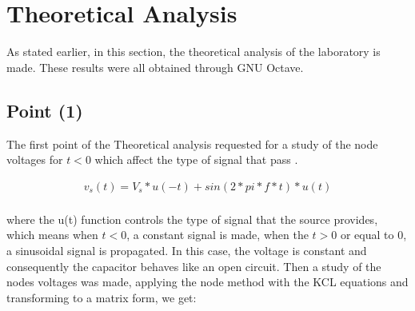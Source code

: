 \section{Theoretical Analysis}
\label{sec:analysis}

\par As stated earlier, in this section, the theoretical analysis of the laboratory is made. These results were all obtained through GNU Octave.



\subsection{Point (1)} 

\par The first point of the Theoretical analysis requested for a study of the node voltages for $t<0$ which affect the type of signal that pass . 

\begin{align*}  
v_s(t)=V_s*u(-t)+sin(2*pi*f*t)*u(t)\\   
\end{align*} 

where the u(t) function controls the type of signal that the source provides, which means when $t<0$, a constant signal is made, when the $t>0$ or equal to 0, a sinusoidal signal is propagated.  
In this case, the voltage is constant and consequently the capacitor behaves like an open circuit. Then a study of the nodes voltages was made, applying the node method with the KCL equations and transforming to a matrix form, we get:

